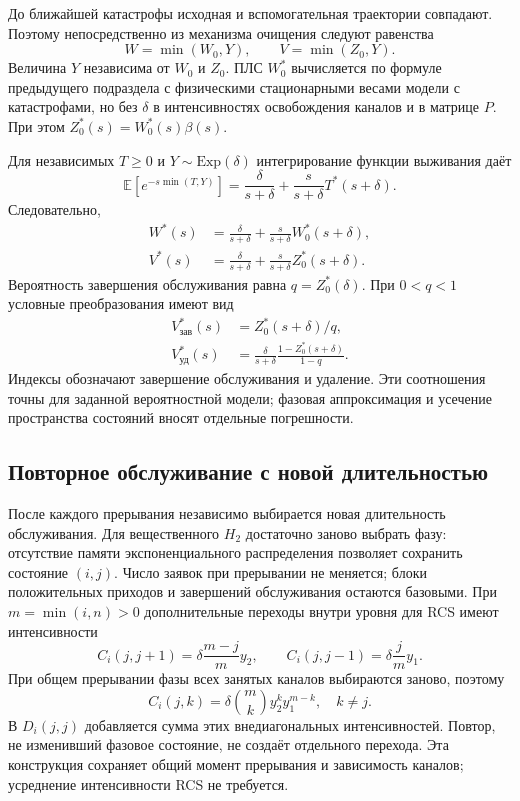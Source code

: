 До ближайшей катастрофы исходная и вспомогательная траектории совпадают. Поэтому непосредственно из механизма очищения следуют равенства
\[
W=\min(W_0,Y),\qquad V=\min(Z_0,Y).
\]
Величина \(Y\) независима от \(W_0\) и \(Z_0\). ПЛС \(W_0^*\) вычисляется по формуле предыдущего подраздела с физическими стационарными весами модели с катастрофами, но без \(\delta\) в интенсивностях освобождения каналов и в матрице \(P\). При этом \(Z_0^*(s)=W_0^*(s)\beta(s)\).

Для независимых \(T\ge0\) и \(Y\sim\mathrm{Exp}(\delta)\) интегрирование функции выживания даёт
\[
\mathbb E[e^{-s\min(T,Y)}]=\frac{\delta}{s+\delta}+\frac{s}{s+\delta}T^*(s+\delta).
\]
Следовательно,
\begin{align*}
W^*(s)&=\frac{\delta}{s+\delta}+\frac{s}{s+\delta}W_0^*(s+\delta),\\
V^*(s)&=\frac{\delta}{s+\delta}+\frac{s}{s+\delta}Z_0^*(s+\delta).
\end{align*}
Вероятность завершения обслуживания равна \(q=Z_0^*(\delta)\). При \(0<q<1\) условные преобразования имеют вид
\begin{align*}
V_{\text{зав}}^*(s)&=Z_0^*(s+\delta)/q,\\
V_{\text{уд}}^*(s)&=\frac{\delta}{s+\delta}\frac{1-Z_0^*(s+\delta)}{1-q}.
\end{align*}
Индексы обозначают завершение обслуживания и удаление. Эти соотношения точны для заданной вероятностной модели; фазовая аппроксимация и усечение пространства состояний вносят отдельные погрешности.

\subsection{Повторное обслуживание с новой длительностью}
После каждого прерывания независимо выбирается новая длительность обслуживания. Для вещественного \(H_2\) достаточно заново выбрать фазу: отсутствие памяти экспоненциального распределения позволяет сохранить состояние \((i,j)\). Число заявок при прерывании не меняется; блоки положительных приходов и завершений обслуживания остаются базовыми. При \(m=\min(i,n)>0\) дополнительные переходы внутри уровня для RCS имеют интенсивности
\[
C_i(j,j+1)=\delta\frac{m-j}{m}y_2,\qquad
C_i(j,j-1)=\delta\frac{j}{m}y_1.
\]
При общем прерывании фазы всех занятых каналов выбираются заново, поэтому
\[
C_i(j,k)=\delta\binom{m}{k}y_2^k y_1^{m-k},\quad k\ne j.
\]
В \(D_i(j,j)\) добавляется сумма этих внедиагональных интенсивностей. Повтор, не изменивший фазовое состояние, не создаёт отдельного перехода. Эта конструкция сохраняет общий момент прерывания и зависимость каналов; усреднение интенсивности RCS не требуется.

